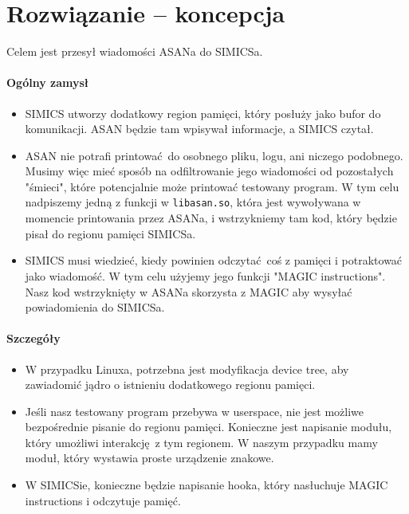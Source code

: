 \documentclass[../main.tex]{subfiles}
\begin{document}
	
	
\section{Rozwiązanie -- koncepcja}
Celem jest przesył wiadomości ASANa do SIMICSa.

\paragraph{Ogólny zamysł}
\begin{itemize}
	\item SIMICS utworzy dodatkowy region pamięci, który posłuży jako bufor do
		komunikacji. ASAN będzie tam wpisywał informacje, a SIMICS czytał.
	\item ASAN nie potrafi printować do osobnego pliku, logu, ani niczego
		podobnego. Musimy więc mieć sposób na odfiltrowanie jego wiadomości od
		pozostałych "śmieci", które potencjalnie może printować testowany
		program. W tym celu nadpiszemy jedną z funkcji w
		\texttt{libasan.so}, która jest wywoływana w momencie
		printowania przez ASANa, i wstrzykniemy tam kod, który będzie pisał do
		regionu pamięci SIMICSa.
	\item SIMICS musi wiedzieć, kiedy powinien odczytać coś z pamięci i
		potraktować jako wiadomość. W tym celu użyjemy jego funkcji "MAGIC
		instructions". Nasz kod wstrzyknięty w ASANa skorzysta z MAGIC aby
		wysyłać powiadomienia do SIMICSa.
\end{itemize}

\paragraph{Szczegóły}
\begin{itemize}
	\item W przypadku Linuxa, potrzebna jest modyfikacja device tree, aby
		zawiadomić jądro o istnieniu dodatkowego regionu pamięci.
	\item Jeśli nasz testowany program przebywa w userspace, nie jest możliwe
		bezpośrednie pisanie do regionu pamięci. Konieczne jest napisanie
		modułu, który umożliwi interakcję z tym regionem. W naszym przypadku
		mamy moduł, który wystawia proste urządzenie znakowe.
	\item W SIMICSie, konieczne będzie napisanie hooka, który nasłuchuje MAGIC
		instructions i odczytuje pamięć.
\end{itemize}

\newpage
\end{document}
